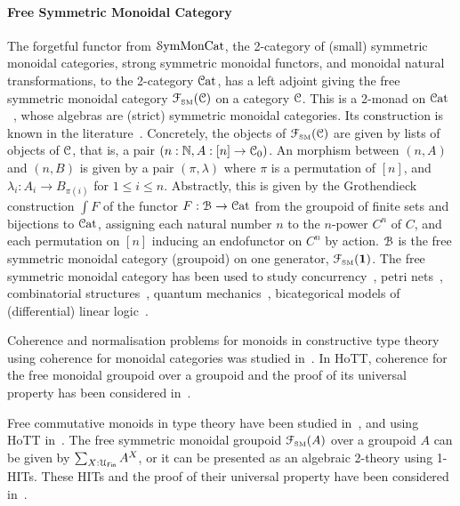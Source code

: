 \paragraph{Free Symmetric Monoidal Category} The forgetful functor from $\SymMonCat$, the 2-category of (small)
symmetric monoidal categories, strong symmetric monoidal functors, and monoidal natural transformations, to the
2-category $\CatCat$, has a left adjoint giving the free symmetric monoidal category $\FSM[\CCat{C}]$ on a category
$\CCat{C}$. This is a 2-monad on $\CatCat$~\cite{blackwellTwodimensionalMonadTheory1989}, whose algebras are (strict)
symmetric monoidal categories. Its construction is known in the literature~\cite{abramskyAbstractScalarsLoops2005}.
Concretely, the objects of $\FSM[\CCat{C}]$ are given by lists of objects of $\CCat{C}$, that is, a pair $(n:\Nat, A:[n]
    \to \CCat{C}_{0})$. An morphism between $(n,A)$ and $(n,B)$ is given by a pair $(\pi,\lambda)$ where $\pi$ is a
permutation of $[n]$, and $\lambda_{i} : A_{i} \to B_{\pi(i)}$ for $1 \leq i \leq n$. Abstractly, this is given by the
Grothendieck construction $\int F$ of the functor $F : \BFin \to \CatCat$ from the groupoid of finite sets and
bijections to $\CatCat$, assigning each natural number $n$ to the $n$-power $C^{n}$ of $C$, and each permutation on
$[n]$ inducing an endofunctor on $C^{n}$ by action. $\BFin$ is the free symmetric monoidal category (groupoid) on one
generator, $\FSM[\unit]$. The free symmetric monoidal category has been used to study
concurrency~\cite{hylandSymmetricMonoidalSketches2004}, petri nets~\cite{baezCategoriesNets2021}, combinatorial
structures~\cite{fioreCartesianClosedBicategory2008}, quantum mechanics~\cite{abramskyAbstractScalarsLoops2005},
bicategorical models of (differential) linear logic~\cite{melliesTemplateGamesDifferential2019}.

Coherence and normalisation problems for monoids in constructive type theory using coherence for monoidal categories was
studied in~\cite{beylinExtractingProofCoherence1996}. In HoTT, coherence for the free monoidal groupoid over a groupoid
and the proof of its universal property has been considered in~\cite{piceghelloCoherenceMonoidalGroupoids2020}.

Free commutative monoids in type theory have been studied in~\cite{gylterudMultisetsTypeTheory2020}, and using HoTT
in~\cite{choudhuryFinitemultisetConstructionHoTT2019}. The free symmetric monoidal groupoid $\FSM[A]$ over a groupoid
$A$ can be given by $\dsum*{X:\UFin}{A^{X}}$, or it can be presented as an algebraic 2-theory using 1-HITs. These HITs
and the proof of their universal property have been considered
in~\cite*{piceghelloCoherenceSymmetricMonoidal2019,choudhuryFinitemultisetConstructionHoTT2019}.

